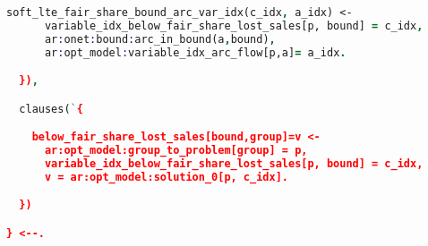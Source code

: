 \begin{lstlisting}[language=Prolog]
    soft_lte_fair_share_bound_arc_var_idx(c_idx, a_idx) <-
      variable_idx_below_fair_share_lost_sales[p, bound] = c_idx,
      ar:onet:bound:arc_in_bound(a,bound),
      ar:opt_model:variable_idx_arc_flow[p,a]= a_idx.

  }),

  clauses(`{

    below_fair_share_lost_sales[bound,group]=v <-
      ar:opt_model:group_to_problem[group] = p,
      variable_idx_below_fair_share_lost_sales[p, bound] = c_idx,
      v = ar:opt_model:solution_0[p, c_idx].

  })

} <--.

\end{lstlisting}
